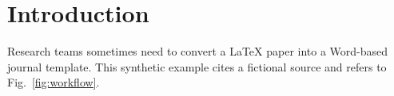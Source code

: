 \section{Introduction}
\label{sec:introduction}

Research teams sometimes need to convert a LaTeX paper into a Word-based journal template.
This synthetic example cites a fictional source \cite{smith2024synthetic} and refers to Fig.~\ref{fig:workflow}.
